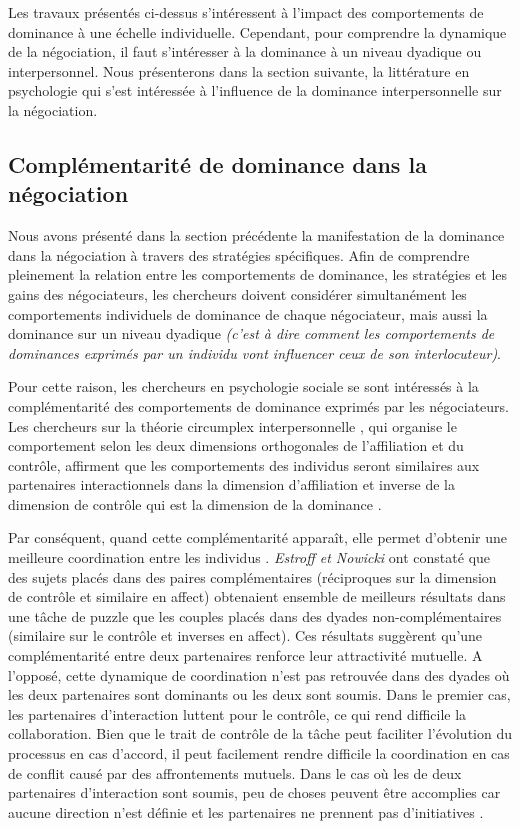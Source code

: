 	Les travaux présentés ci-dessus s'intéressent à l'impact des comportements de dominance à une échelle individuelle. Cependant, pour comprendre la dynamique de la négociation, il faut s'intéresser à la dominance à un niveau dyadique ou interpersonnel. 
	Nous présenterons dans la section suivante, la littérature en psychologie qui s'est intéressée à l'influence de la dominance interpersonnelle sur la négociation. 

	\subsection{Complémentarité de dominance dans la négociation}
	\label{sec:compEtat}
	Nous avons présenté dans la section précédente la manifestation de la dominance dans la négociation à travers des stratégies spécifiques. Afin de comprendre pleinement la relation entre les comportements de dominance, les stratégies et les gains des négociateurs, les chercheurs doivent considérer simultanément les comportements individuels de dominance de chaque négociateur, mais aussi la dominance sur un niveau dyadique \emph{(c'est à dire comment les comportements de dominances exprimés par un individu vont influencer ceux de son interlocuteur)}. 
	
	Pour cette raison, les chercheurs en psychologie sociale se sont intéressés à la complémentarité des comportements de dominance exprimés par les négociateurs. 
	Les chercheurs sur la théorie circumplex interpersonnelle \cite{wiggins1979psychological, kiesler19831982}, qui organise le comportement selon les deux dimensions orthogonales de l'affiliation et du contrôle,
	 affirment que les comportements des individus seront similaires aux partenaires interactionnels dans la dimension d'affiliation et inverse de la dimension de contrôle qui est la dimension de la dominance \cite{tiedens2003power}.
	
	Par conséquent, quand cette complémentarité apparaît, elle permet d'obtenir une meilleure coordination entre les individus \cite{wiltermuth2015benefits}. \emph{Estroff et Nowicki} \cite{estroff1992interpersonal} ont constaté que des sujets placés dans des paires complémentaires (réciproques sur la dimension de contrôle et similaire en affect) obtenaient ensemble de meilleurs résultats dans une tâche de puzzle que les couples placés dans des dyades non-complémentaires (similaire sur le contrôle et inverses en affect). Ces résultats suggèrent qu'une complémentarité entre deux partenaires renforce leur attractivité mutuelle.
	A l'opposé, cette dynamique de coordination n'est pas retrouvée dans des dyades où les deux partenaires sont dominants ou les deux sont soumis. 
	Dans le premier cas, les partenaires d'interaction luttent pour le contrôle, ce qui rend difficile la collaboration. Bien que le trait de contrôle de la tâche peut faciliter l'évolution du processus en cas d'accord, il peut facilement rendre difficile la coordination en cas de conflit causé par des affrontements mutuels. Dans le cas où les de deux partenaires d'interaction sont soumis, peu de choses peuvent être accomplies car aucune direction n'est définie et les partenaires ne prennent pas d'initiatives \cite{wiltermuth2015benefits}.
	 
